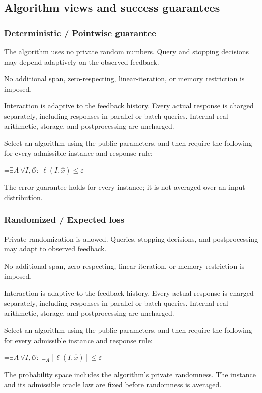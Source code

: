 \documentclass[10pt,a4paper]{article}
\newcommand{\AtlasMath}[1]{\par\begingroup\centering\setbox0=\hbox{$\displaystyle #1$}\ifdim\wd0>1.4\linewidth\typeout{ATLAS WIDE FORMULA: \the\wd0}\fi\ifdim\wd0>\linewidth\resizebox{\linewidth}{!}{\box0}\else\box0\fi\par\endgroup}
\begin{document}
\subsection{Algorithm views and success guarantees}
\subsubsection{Deterministic / Pointwise guarantee}
The algorithm uses no private random numbers. Query and stopping decisions may depend adaptively on the observed feedback.

No additional span, zero-respecting, linear-iteration, or memory restriction is imposed.

Interaction is adaptive to the feedback history. Every actual response is charged separately, including responses in parallel or batch queries. Internal real arithmetic, storage, and postprocessing are uncharged.

Select an algorithm using the public parameters, and then require the following for every admissible instance and response rule:


\AtlasMath{\exists A\ \forall I,\mathcal{O}:\ \ell(I,\widehat{x})\le\varepsilon}


The error guarantee holds for every instance; it is not averaged over an input distribution.

\subsubsection{Randomized / Expected loss}
Private randomization is allowed. Queries, stopping decisions, and postprocessing may adapt to observed feedback.

No additional span, zero-respecting, linear-iteration, or memory restriction is imposed.

Interaction is adaptive to the feedback history. Every actual response is charged separately, including responses in parallel or batch queries. Internal real arithmetic, storage, and postprocessing are uncharged.

Select an algorithm using the public parameters, and then require the following for every admissible instance and response rule:


\AtlasMath{\exists A\ \forall I,\mathcal{O}:\ \mathbb{E}_A[\ell(I,\widehat{x})]\le\varepsilon}


The probability space includes the algorithm's private randomness. The instance and its admissible oracle law are fixed before randomness is averaged.
\end{document}
